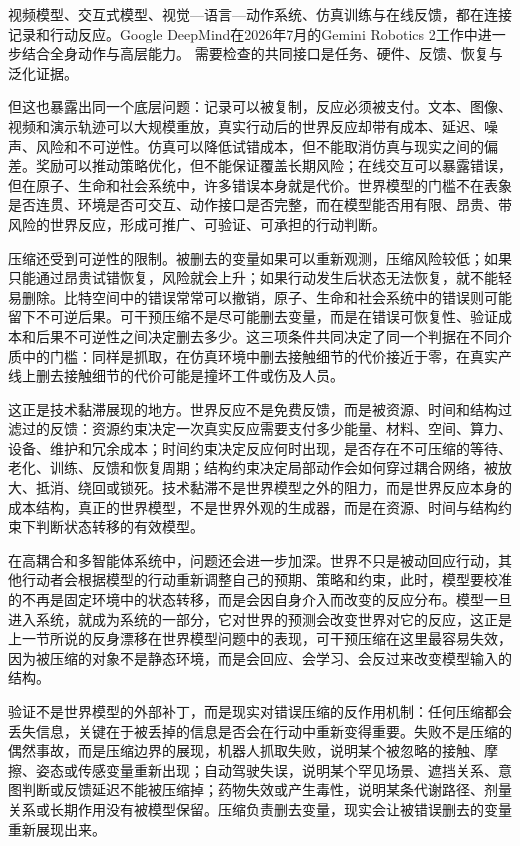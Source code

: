 
视频模型、交互式模型、视觉—语言—动作系统、仿真训练与在线反馈，都在连接记录和行动反应。Google DeepMind在2026年7月的Gemini Robotics 2工作中进一步结合全身动作与高层能力。\cite{geminirobotics2026} 需要检查的共同接口是任务、硬件、反馈、恢复与泛化证据。

但这也暴露出同一个底层问题：记录可以被复制，反应必须被支付。文本、图像、视频和演示轨迹可以大规模重放，真实行动后的世界反应却带有成本、延迟、噪声、风险和不可逆性。仿真可以降低试错成本，但不能取消仿真与现实之间的偏差\cite{tobin2017domain}。奖励可以推动策略优化，但不能保证覆盖长期风险；在线交互可以暴露错误，但在原子、生命和社会系统中，许多错误本身就是代价。世界模型的门槛不在表象是否连贯、环境是否可交互、动作接口是否完整，而在模型能否用有限、昂贵、带风险的世界反应，形成可推广、可验证、可承担的行动判断。

压缩还受到可逆性的限制。被删去的变量如果可以重新观测，压缩风险较低；如果只能通过昂贵试错恢复，风险就会上升；如果行动发生后状态无法恢复，就不能轻易删除。比特空间中的错误常常可以撤销，原子、生命和社会系统中的错误则可能留下不可逆后果。可干预压缩不是尽可能删去变量，而是在错误可恢复性、验证成本和后果不可逆性之间决定删去多少。这三项条件共同决定了同一个判据在不同介质中的门槛：同样是抓取，在仿真环境中删去接触细节的代价接近于零，在真实产线上删去接触细节的代价可能是撞坏工件或伤及人员。


这正是技术黏滞展现的地方。世界反应不是免费反馈，而是被资源、时间和结构过滤过的反馈：资源约束决定一次真实反应需要支付多少能量、材料、空间、算力、设备、维护和冗余成本；时间约束决定反应何时出现，是否存在不可压缩的等待、老化、训练、反馈和恢复周期；结构约束决定局部动作会如何穿过耦合网络，被放大、抵消、绕回或锁死。技术黏滞不是世界模型之外的阻力，而是世界反应本身的成本结构，真正的世界模型，不是世界外观的生成器，而是在资源、时间与结构约束下判断状态转移的有效模型。

在高耦合和多智能体系统中，问题还会进一步加深。世界不只是被动回应行动，其他行动者会根据模型的行动重新调整自己的预期、策略和约束，此时，模型要校准的不再是固定环境中的状态转移，而是会因自身介入而改变的反应分布。模型一旦进入系统，就成为系统的一部分，它对世界的预测会改变世界对它的反应，这正是上一节所说的反身漂移在世界模型问题中的表现，可干预压缩在这里最容易失效，因为被压缩的对象不是静态环境，而是会回应、会学习、会反过来改变模型输入的结构。

验证不是世界模型的外部补丁，而是现实对错误压缩的反作用机制：任何压缩都会丢失信息，关键在于被丢掉的信息是否会在行动中重新变得重要。失败不是压缩的偶然事故，而是压缩边界的展现，机器人抓取失败，说明某个被忽略的接触、摩擦、姿态或传感变量重新出现；自动驾驶失误，说明某个罕见场景、遮挡关系、意图判断或反馈延迟不能被压缩掉；药物失效或产生毒性，说明某条代谢路径、剂量关系或长期作用没有被模型保留。压缩负责删去变量，现实会让被错误删去的变量重新展现出来。

